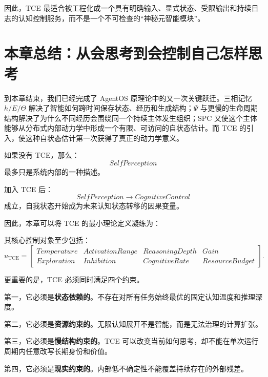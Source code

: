因此，TCE 最适合被工程化成一个具有明确输入、显式状态、受限输出和持续日志的认知控制服务，而不是一个不可检查的“神秘元智能模块”。

\section{本章总结：从会思考到会控制自己怎样思考}

到本章结束，我们已经完成了 AgentOS 原理论中的又一次关键跃迁。三相记忆 $h/E/\Theta$ 解决了智能如何跨时间保存状态、经历和生成结构；$\Psi$ 与更慢的生命周期结构解决了为什么不同经历会围绕同一个持续主体发生组织；SPC 又使这个主体能够从分布式内部动力学中形成一个有限、可访问的自状态估计。而 TCE 的引入，使这种自状态估计第一次获得了真正的动力学意义。

如果没有 TCE，那么：
\begin{equation}
    SelfPerception
\end{equation}
最多只是系统内部的一种描述。

加入 TCE 后：
\begin{equation}
    SelfPerception
    \rightarrow
    CognitiveControl
\end{equation}
成立，自我状态开始成为未来认知状态转移的因果变量。

因此，本章可以将 TCE 的最小理论定义凝练为：
\begin{statementbox}
\centering
{}
\end{statementbox}
其核心控制对象至少包括：
\begin{equation}
    u_{\mathrm{TCE}}
    =
    \begin{bmatrix}
    Temperature & ActivationRange & ReasoningDepth & Gain\\
    Exploration & Inhibition & CognitiveRate & ResourceBudget
    \end{bmatrix}.
\end{equation}

更重要的是，TCE 必须同时满足四个约束。

第一，它必须是\textbf{状态依赖的}。不存在对所有任务始终最优的固定认知温度和推理深度。

第二，它必须是\textbf{资源约束的}。无限认知展开不是智能，而是无法治理的计算扩张。

第三，它必须是\textbf{慢结构约束的}。TCE 可以改变当前如何思考，却不能在单次运行周期内任意改写长期身份和价值。

第四，它必须是\textbf{现实约束的}。内部低不确定性不能覆盖持续存在的外部残差。

